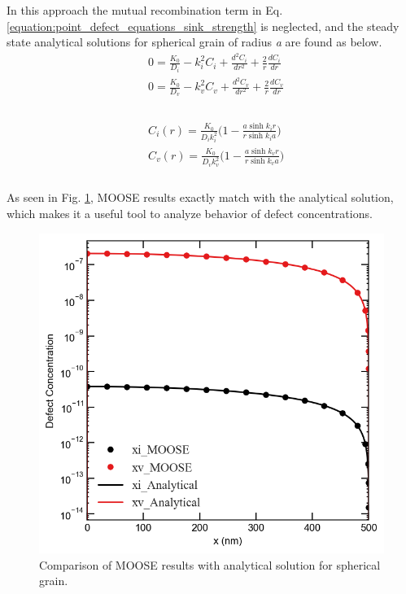 \documentclass[a4paper]{article}
\begin{document}
  In this approach the mutual recombination term in Eq. \ref{equation:point_defect_equations_sink_strength} is neglected, and the steady state analytical solutions for spherical grain of radius \textit{a} are found as below.\cite{heald1977}\\

  \begin{equation}
    \begin{aligned}
      &0 = \frac{K_0}{D_i} - k_i^2C_i + \frac{d^2C_i}{dr^2}+\frac{2}{r}\frac{dC_i}{dr}\\
      &0 = \frac{K_0}{D_v} - k_v^2C_v + \frac{d^2C_v}{dr^2}+\frac{2}{r}\frac{dC_v}{dr}\\
    \end{aligned}
    \label{equation:spherical_norecomb_point_defect_equations}
  \end{equation}\\
  \begin{equation}
    \begin{aligned}
      &C_i(r)=\frac{K_0}{D_ik_i^2}\bigg(1-\frac{a\sinh{k_ir}}{r\sinh{k_ia}}\bigg)\\
      &C_v(r)=\frac{K_0}{D_vk_v^2}\bigg(1-\frac{a\sinh{k_vr}}{r\sinh{k_va}}\bigg)\\
    \end{aligned}
    \label{equation:spherical_grain_analytical_solution}
  \end{equation}\\

  As seen in Fig. \ref{figure:concentrations_MOOSE_analytical}, MOOSE results exactly match with the analytical solution, which makes it a useful tool to analyze behavior of defect concentrations.
  \begin{figure}[h!]
    \centering
    \includegraphics[scale=0.55]{concentration_profiles_MOOSE_Analytical_Neutron_0}
    \caption{Comparison of MOOSE results with analytical solution for spherical grain.}
    \label{figure:concentrations_MOOSE_analytical}
  \end{figure}
  \newpage
\end{document}

